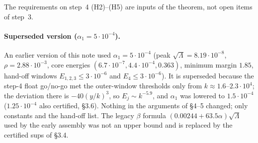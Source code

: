 \documentclass[11pt]{article}
\theoremstyle{definition}
\theoremstyle{remark}
\begin{document}
The requirements on step~4 (H2)--(H5) are inputs of the theorem, not open items of step~3.

\paragraph{Superseded version ($\alpha_1=5\cdot10^{-4}$).} An earlier version of this note used $\alpha_1=5\cdot10^{-4}$ (peak $\sqrt\Lambda=8.19\cdot10^{-8}$, $\rho=2.88\cdot10^{-3}$, core energies $(6.7\cdot10^{-7},4.4\cdot10^{-4},0.363)$, minimum margin $1.85$, hand-off windows $E_{1,2,3}\le3\cdot10^{-6}$ and $E_4\le3\cdot10^{-6}$). It is superseded because the step-4 float go/no-go met the outer-window thresholds only from $k\approx1.6$--$2.3\cdot10^4$; the deviation there is $-40(y/k)^3$, so $E_j\sim k^{-5.9}$, and $\alpha_1$ was lowered to $1.5\cdot10^{-4}$ ($1.25\cdot10^{-4}$ also certified, \S3.6). Nothing in the arguments of \S4--5 changed; only constants and the hand-off list. The legacy $\beta$ formula $(0.00244+63.5\alpha)\sqrt\Lambda$ used by the early assembly was not an upper bound and is replaced by the certified sups of \S3.4.
\end{document}
